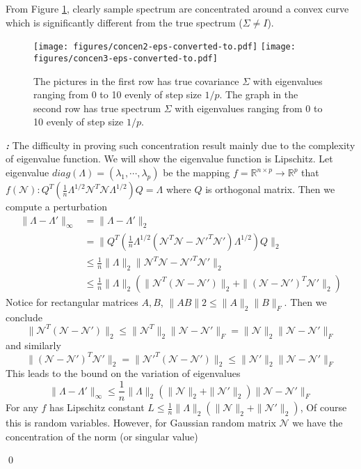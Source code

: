 \documentclass[12pt]{extarticle}
\renewenvironment{proof}[1][\proofname]{ { \it\bfseries #1: }}{\qed}
\newcommand{\cN}{{\mathcal{N}}}
\newcommand{\field}[1]{\mathbb{#1}}
\newcommand{\R}{\field{R}}
\newcommand{\1}{\field{1}}
\numberwithin{equation}{section}
\begin{document}
From Figure \ref{fig: concentration 2 linear}, clearly sample spectrum are concentrated around a convex curve which is significantly different from the true spectrum ($\Sigma \ne I$). 
\begin{figure}[H] 
	\centering
	\texttt{[image: figures/concen2-eps-converted-to.pdf]}
	\texttt{[image: figures/concen3-eps-converted-to.pdf]}
	\caption{The pictures in the first row has true covariance $\Sigma$ with eigenvalues ranging from 0 to 10 evenly of step size $1/p$. The graph in the second row has true spectrum $\Sigma$ with eigenvalues ranging from 0 to 10 evenly of step size $1/p$.}\label{fig: concentration 2 linear}
\end{figure}
\begin{proof}
The difficulty in proving such concentration result mainly due to the complexity of eigenvalue function.  We will show the eigenvalue function is Lipschitz. Let eigenvalue $diag(\Lambda) = (\lambda_1, \cdots, \lambda_p)$ be the mapping $ f =\R^{n\times p} \to \R^p$ that $f(\cN): Q^{T}\left( \frac{1}{n}{\Lambda}^{1/2}  {\cN}^{T}\cN {\Lambda}^{1/2} \right) Q = \Lambda  $ where $Q$ is orthogonal matrix. 
Then we compute a perturbation 
\begin{align*}
    \| \Lambda - \Lambda'\|_{\infty} 
    & = \| \Lambda - \Lambda'\|_2 \\
    & = \| Q^{T}\left( \frac{1}{n}{\Lambda}^{1/2}  ({\cN}^{T}\cN - {\cN'}^{T}\cN') {\Lambda}^{1/2} \right) Q \|_2 \\
    & \le \frac{1}{n} \|{\Lambda}\|_2  \| {\cN}^{T}\cN - {\cN'}^{T}\cN'\|_2 \\
    & \le \frac{1}{n} \|{\Lambda}\|_2 ( \| {\cN}^{T}(\cN - \cN')\|_2+ \| {(\cN-\cN')}^{T}\cN'\|_2)
\end{align*}
Notice for rectangular matrices $A,B$, $\|AB\|2\le \|A\|_2\|B\|_F$. Then we conclude 
\[
\| {\cN}^{T}(\cN - \cN')\|_2 \le \| {\cN}^{T}\|_2 \|\cN - \cN'\|_F = \| {\cN}\|_2 \|\cN - \cN'\|_F 
\]
and similarly
\[
\| (\cN - \cN')^{T}{\cN'}\|_2 =\| {\cN'}^{T}(\cN - \cN')\|_2 \le \| {\cN'}\|_2 \|\cN - \cN'\|_F 
\]
This leads to the bound on the variation of eigenvalues
\[
\| \Lambda - \Lambda'\|_{\infty} \le \frac{1}{n} \|{\Lambda}\|_2 (\|\cN\|_2 +\|\cN'\|_2) \|\cN - \cN'\|_F
\]
For any $f$ has Lipschitz constant $L \le \frac{1}{n} \|{\Lambda}\|_2 (\|\cN\|_2 +\|\cN'\|_2)$, Of course this is random variables. However, for Gaussian random matrix $\cN$ we have the concentration of the norm (or singular value) \cite{rudelson2010non}

\end{proof}
\end{document}
